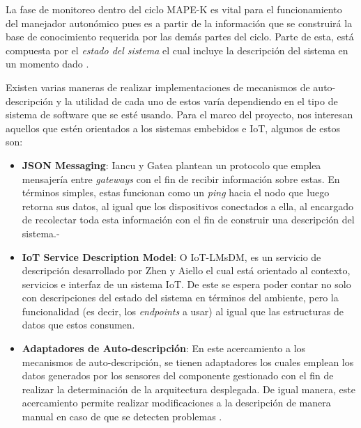 \documentclass[12pt]{article}
\begin{document}

    La fase de monitoreo dentro del ciclo MAPE-K es vital para el funcionamiento del manejador autonómico pues es a partir de la información que se construirá la base de conocimiento requerida por las demás partes del ciclo. Parte de esta, está compuesta por el \textit{estado del sistema} el cual incluye la descripción del sistema en un momento dado \cite{Weiss_2011}.

    Existen varias maneras de realizar implementaciones de mecanismos de auto-descripción y la utilidad de cada uno de estos varía dependiendo en el tipo de sistema de software que se esté usando. Para el marco del proyecto, nos interesan aquellos que estén orientados a los sistemas embebidos e  IoT, algunos de estos son:
    
    \begin{itemize}
        \item \textbf{JSON Messaging}: Iancu y Gatea \citeyear{Iancu_2022} plantean un protocolo que emplea mensajería entre \textit{gateways} con el fin de recibir información sobre estas. En términos simples, estas funcionan como un \textit{ping} hacia el nodo que luego retorna sus datos, al igual que los dispositivos conectados a ella, al encargado de recolectar toda esta información con el fin de construir una descripción del sistema.-
        
        \item \textbf{IoT Service Description Model}: O IoT-LMsDM, es un servicio de descripción desarrollado por Zhen y Aiello \citeyear{Wang_2021} el cual está orientado al contexto, servicios e interfaz de un sistema IoT. De este se espera poder contar no solo con descripciones del estado del sistema en términos del ambiente, pero la funcionalidad (es decir, los \textit{endpoints} a usar) al igual que las estructuras de datos que estos consumen.
        
        \item \textbf{Adaptadores de Auto-descripción}: En este acercamiento a los mecanismos de auto-descripción, se tienen adaptadores los cuales emplean los datos generados por los sensores del componente gestionado con el fin de realizar la determinación de la arquitectura desplegada. De igual manera, este acercamiento permite realizar modificaciones a la descripción de manera manual en caso de que se detecten problemas \cite{msc_henry_2022}.

    \end{itemize}
\end{document}
